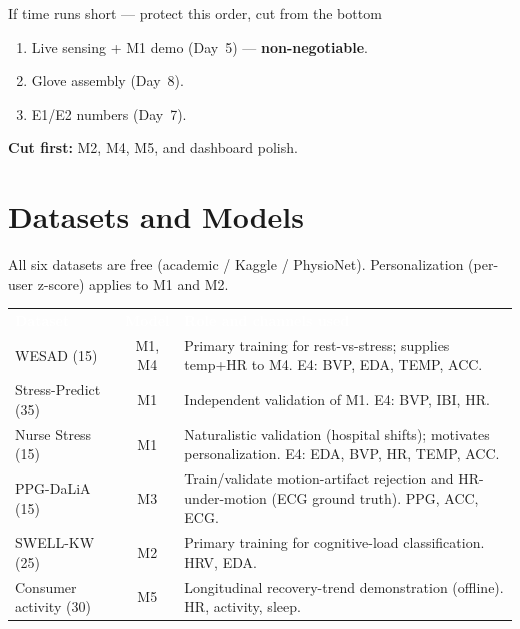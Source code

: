 \documentclass[11pt]{article}
\newcommand{\hd}[1]{\textbf{\sffamily\textcolor{white}{#1}}}
\begin{document}
\begin{callout}[nsred]{If time runs short --- protect this order, cut from the bottom}
\begin{enumerate}[leftmargin=1.5em, itemsep=2pt, nosep]
\item Live sensing + M1 demo (Day~5) --- \textbf{non-negotiable}.
\item Glove assembly (Day~8).
\item E1/E2 numbers (Day~7).
\end{enumerate}
\vspace{2pt}
\textbf{Cut first:} M2, M4, M5, and dashboard polish.
\end{callout}

\section{Datasets and Models}\label{sec:data}

All six datasets are free (academic / Kaggle / PhysioNet). Personalization (per-user z-score) applies
to M1 and M2.

{
\begin{tabularx}{\linewidth}{@{}L c Y@{}}
 \hd{Dataset} & \hd{Model} & \hd{Role and channels used} \\
WESAD (15) & M1, M4 & Primary training for rest-vs-stress; supplies temp+HR to M4. E4: BVP, EDA, TEMP, ACC. \\
Stress-Predict (35) & M1 & Independent validation of M1. E4: BVP, IBI, HR. \\
Nurse Stress (15) & M1 & Naturalistic validation (hospital shifts); motivates personalization. E4: EDA, BVP, HR, TEMP, ACC. \\
PPG-DaLiA (15) & M3 & Train/validate motion-artifact rejection and HR-under-motion (ECG ground truth). PPG, ACC, ECG. \\
SWELL-KW (25) & M2 & Primary training for cognitive-load classification. HRV, EDA. \\
Consumer activity (30) & M5 & Longitudinal recovery-trend demonstration (offline). HR, activity, sleep. \\
\end{tabularx}}
\end{document}
